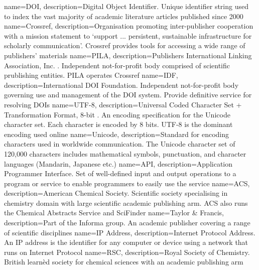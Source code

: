 {
name={DOI},
description={Digital Object Identifier. Unique identifier string used to index the vast majority of academic literature articles published since 2000 \cite{glossarydoi}} 
}
{
name={Crossref},
description={Organisation promoting inter-publisher cooperation with a mission statement to `support ... persistent, sustainable infrastructure for scholarly communication'\cite{crossref-formation}. Crossref provides tools for accessing a wide range of publishers' materials} 
}
{
name={PILA},
description={Publishers International Linking Association, Inc. . Independent not-for-profit body comprised of scientific prublishing entities. PILA operates Crossref \cite{crossref-formation}} 
}
{ 
name={IDF},
description={International DOI Foundation. Independent not-for-profit body governing use and management of the DOI system. Provide definitive service for resolving DOIs \cite{doi_handbook2}} 
}
{
name={UTF-8},
description={Universal Coded Character Set + Transformation Format, 8-bit \cite{utf8}. An encoding specification for the Unicode character set. Each character is encoded by 8 bits. UTF-8 is the dominant encoding used online \cite{utf8stats}} 
}
{
name={Unicode},
description={Standard for encoding characters used in worldwide communication. The Unicode character set of 120,000 characters includes mathematical symbols, punctuation, and character languages (Mandarin, Japanese etc.)} 
}
{
name={API},
description={Application Programmer Interface. Set of well-defined input and output operations to a program or service to enable programmers to easily use the service} 
}
{
name={ACS},
description={American Chemical Society. Scientific society specialising in chemistry domain with  large scientific academic publishing arm. ACS also runs the Chemical Abstracts Service and SciFinder\textsuperscript{\textregistered}} 
}
{
name={Taylor \& Francis},
description={Part of the Informa group. An academic publisher covering a range of scientific disciplines} 
}
{
name={IP Address},
description={Internet Protocol Address. An IP address is the identifier for any computer or device using a network that runs on Internet Protocol} 
}
{
name={RSC},
description={Royal Society of Chemistry. British learn\`ed society for chemical sciences with an academic publishing arm} 
}
